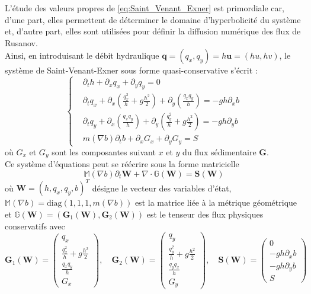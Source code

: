 \documentclass[11pt, a4paper, oneside]{report}
\begin{document}
L'étude des valeurs propres de \eqref{eq:Saint_Venant_Exner} est primordiale car, d'une part, elles permettent de déterminer le domaine d'hyperbolicité du système et, d'autre part, elles sont utilisées pour définir la diffusion numérique des flux de Rusanov. \\
Ainsi, en introduisant le débit hydraulique $\bm{q} = (q_x, q_y) = h \bm{u} = (hu, hv)$, le système de Saint-Venant-Exner sous forme quasi-conservative s'écrit :
\begin{equation}
    \left \{
    \begin{aligned}
        & \partial_t h + \partial_x q_x + \partial_y q_y = 0 \\
        & \partial_t q_x + \partial_x \left( \frac{q_x^2}{h} + g \frac{h^2}{2} \right) + \partial_y \left( \frac{q_x q_y}{h} \right) = - g h \partial_x b \\
        & \partial_t q_y + \partial_x \left( \frac{q_x q_y}{h} \right) + \partial_y \left( \frac{q_y^2}{h} + g \frac{h^2}{2} \right) = - g h \partial_y b \\
        & m(\nabla b) \partial_t b + \partial_x G_x + \partial_y G_y = S
    \end{aligned}
    \right .
\end{equation}
où $G_x$ et $G_y$ sont les composantes suivant $x$ et $y$ du flux sédimentaire $\bm{G}$. \\
Ce système d'équations peut se réécrire sous la forme matricielle
\begin{equation}
    \mathbb{M}(\nabla b) \partial_t \bm{W} + \nabla \cdot \mathbb{G}(\bm{W}) = \bm{S}(\bm{W})
\end{equation}
où $\bm{W} = (h, q_x, q_y, b)^T$ désigne le vecteur des variables d'état, $\mathbb{M}(\nabla b) = \text{diag}(1, 1, 1, m(\nabla b))$ est la matrice liée à la métrique géométrique et $\mathbb{G}(\bm{W}) = (\bm{G}_1(\bm{W}), \bm{G}_2(\bm{W}))$ est le tenseur des flux physiques conservatifs avec
\begin{equation}
    \bm{G}_1(\bm{W}) = \begin{pmatrix}
        q_x \\
        \frac{q_x^2}{h} + g \frac{h^2}{2} \\
        \frac{q_x q_y}{h} \\
        G_x
    \end{pmatrix}, \quad
    \bm{G}_2(\bm{W}) = \begin{pmatrix}
        q_y \\
        \frac{q_y^2}{h} + g \frac{h^2}{2} \\
        \frac{q_y q_x}{h} \\
        G_y
    \end{pmatrix}, \quad
    \bm{S}(\bm{W}) = \begin{pmatrix}
        0 \\
        - gh \partial_x b \\
        - gh \partial_y b \\
        S
    \end{pmatrix}
\end{equation}
\end{document}
